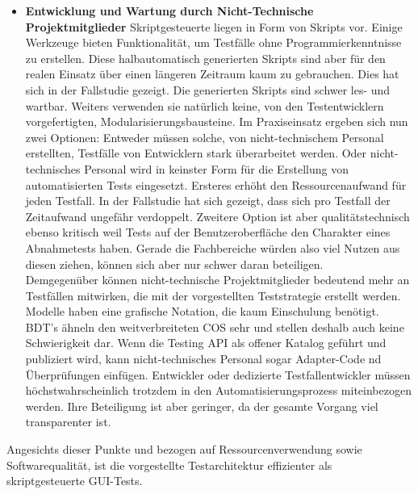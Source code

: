 \begin{itemize}
\item \textbf{Entwicklung und Wartung durch Nicht-Technische Projektmitglieder} Skriptgesteuerte liegen in Form von Skripts vor. Einige Werkzeuge bieten Funktionalität, um Testfälle ohne Programmierkenntnisse zu erstellen. Diese halbautomatisch generierten Skripts sind aber für den realen Einsatz über einen längeren Zeitraum kaum zu gebrauchen. Dies hat sich in der Fallstudie gezeigt. Die generierten Skripts sind schwer les- und wartbar. Weiters verwenden sie natürlich keine, von den Testentwicklern vorgefertigten, Modularisierungsbausteine. Im Praxiseinsatz ergeben sich nun zwei Optionen: Entweder müssen solche, von nicht-technischem Personal erstellten, Testfälle von Entwicklern stark überarbeitet werden. Oder nicht-technisches Personal wird in keinster Form für die Erstellung von automatisierten Tests eingesetzt. Ersteres erhöht den Ressourcenaufwand für jeden Testfall. In der Fallstudie hat sich gezeigt, dass sich pro Testfall der Zeitaufwand ungefähr verdoppelt. Zweitere Option ist aber qualitätstechnisch ebenso kritisch weil Tests auf der Benutzeroberfläche den Charakter eines Abnahmetests haben. Gerade die Fachbereiche würden also viel Nutzen aus diesen ziehen, können sich aber nur schwer daran beteiligen.\\
Demgegenüber können nicht-technische Projektmitglieder bedeutend mehr an Testfällen mitwirken, die mit der vorgestellten Teststrategie erstellt werden. Modelle haben eine grafische Notation, die kaum Einschulung benötigt. \Gls{BDT}'s ähneln den weitverbreiteten \Gls{COS} sehr und stellen deshalb auch keine Schwierigkeit dar. Wenn die Testing API als offener Katalog geführt und publiziert wird, kann nicht-technisches Personal sogar Adapter-Code nd Überprüfungen einfügen. Entwickler oder dedizierte Testfallentwickler müssen höchstwahrscheinlich trotzdem in den Automatisierungsprozess miteinbezogen werden. Ihre Beteiligung ist aber geringer, da der gesamte Vorgang viel transparenter ist.
\end{itemize}

Angesichts dieser Punkte und bezogen auf Ressourcenverwendung sowie Softwarequalität, ist die vorgestellte Testarchitektur effizienter als skriptgesteuerte GUI-Tests.

